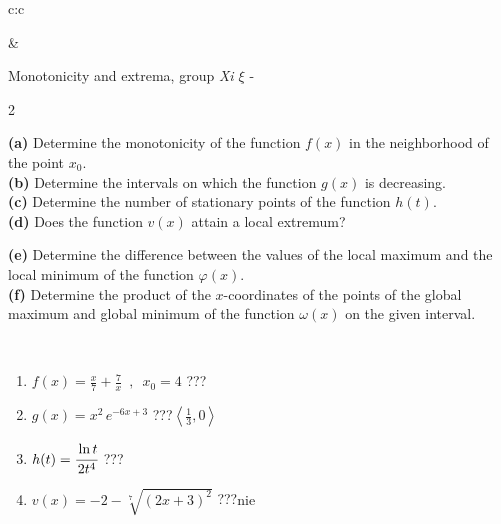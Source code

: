 \documentclass[10pt]{report}
\begin{document}
\begin{tabular}{c:c}
\begin{minipage}[c][104.5mm][t]{0.5\linewidth}
\begin{center}
\begin{minipage}{0.20\linewidth}
\end{minipage}
\end{center}
\end{minipage}
&
\begin{minipage}[c][104.5mm][t]{0.5\linewidth}
\begin{center}
\vspace{5mm}
{\huge Monotonicity and extrema, group \textit{Xi $\xi$} -}\\[5mm]
\begin{minipage}{0.95\linewidth}
\begin{center}
{\small \begin{multicols}{2} \raggedright
\textbf{(a)} Determine the monotonicity of the function \(f(x)\) in the neighborhood of the point \(x_0\). \\[1mm]
\textbf{(b)} Determine the intervals on which the function \(g(x)\) is decreasing. \\[1mm]
\textbf{(c)} Determine the number of stationary points of the function \(h(t)\). \\[1mm]
\textbf{(d)} Does the function \(v(x)\) attain a local extremum? \par \columnbreak
\textbf{(e)} Determine the difference between the values of the local maximum and the local minimum of the function \(\varphi(x)\). \\[1mm]
\textbf{(f)} Determine the product of the \(x\)-coordinates of the points of the global maximum and global minimum of the function \(\omega(x)\) on the given interval. \\[1mm]
\end{multicols}
}
\end{center}
\end{minipage}
\\[1mm]
\begin{minipage}{0.79\linewidth}
\begin{center}
\begin{varwidth}{\linewidth}
\setlength{\itemsep}{0pt}
\begin{enumerate}
\normalsize
\item $f(x)=\frac{x}{7}+\frac{7}{x} \enspace , \enspace x_0=4$\quad \dotfill\; ???\;\dotfill \quad {}
\item $g(x)=x^2\, e^{-6x+3}$\quad \dotfill\; ???\;\dotfill \quad $\left\langle\frac{1}{3} , 0\right\rangle$
\item $h(t)=\cfrac{\ln t}{2t^4}$\quad \dotfill\; ???\;\dotfill {}
\item $v(x)=-2-\sqrt[7]{(2x+3)^2}$\quad \dotfill\; ???\;\dotfill \quad $\text{nie}$

\end{enumerate}
\end{varwidth}
\end{center}
\end{minipage}
\end{center}
\end{minipage}
\end{tabular}
\end{document}
